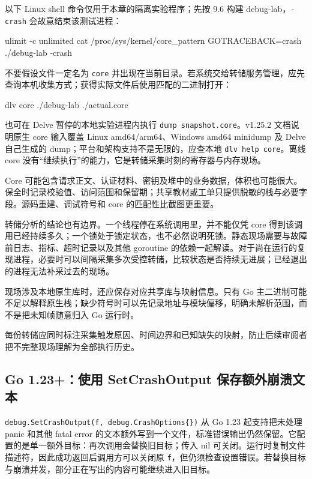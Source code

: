 \documentclass[UTF8,fontset=fandol,openany,11pt]{ctexbook}
\begin{document}
以下 Linux shell 命令仅用于本章的隔离实验程序；先按 9.6 构建 debug-lab，\texttt{-\allowbreak{}crash} 会故意结束该测试进程：

\begin{codeblock}
ulimit -c unlimited
cat /proc/sys/kernel/core_pattern
GOTRACEBACK=crash ./debug-lab -crash
\end{codeblock}

不要假设文件一定名为 \texttt{core} 并出现在当前目录。若系统交给转储服务管理，应先查询本机收集方式；获得实际文件后使用匹配的二进制打开：

\begin{codeblock}
dlv core ./debug-lab ./actual.core
\end{codeblock}

也可在 Delve 暂停的本地实验进程内执行 \texttt{dump snapshot.\allowbreak{}core}。v1.25.2 文档说明原生 core 输入覆盖 Linux amd64/arm64、Windows amd64 minidump 及 Delve 自己生成的 dump；平台和架构支持不是无限的，应查本地 \texttt{dlv help core}。离线 core 没有“继续执行”的能力，它是转储采集时刻的寄存器与内存现场。\cite{tools-delve-core}\cite{tools-delve-cli}

Core 可能包含请求正文、认证材料、密钥及堆中的业务数据，体积也可能很大。保全时记录校验值、访问范围和保留期；共享教材或工单只提供脱敏的栈与必要字段。源码重建、调试符号和 core 的匹配性比截图更重要。

转储分析的结论也有边界。一个线程停在系统调用里，并不能仅凭 core 得到该调用已经持续多久；一个锁处于锁定状态，也不必然说明死锁。静态现场需要与故障前日志、指标、超时记录以及其他 goroutine 的依赖一起解读。对于尚在运行的复现进程，必要时可以间隔采集多次受控转储，比较状态是否持续无进展；已经退出的进程无法补采过去的现场。

现场涉及本地原生库时，还应保存对应共享库与映射信息。只有 Go 主二进制可能不足以解释原生栈；缺少符号时可以先记录地址与模块偏移，明确未解析范围，而不是把未知帧随意归入 Go 运行时。

每份转储应同时标注采集触发原因、时间边界和已知缺失的映射，防止后续审阅者把不完整现场理解为全部执行历史。

\subsection{Go 1.23+：使用 SetCrashOutput 保存额外崩溃文本}
\texttt{debug.\allowbreak{}SetCrashOu\allowbreak{}tput(f, debug.\allowbreak{}CrashOptions\{\})} 从 Go 1.23 起支持把未处理 panic 和其他 fatal error 的文本额外写到一个文件，标准错误输出仍然保留。它配置的是单一额外目标：再次调用会替换旧目标；传入 nil 可关闭。运行时复制文件描述符，因此成功返回后调用方可以关闭原 \texttt{f}，但仍须检查设置错误。若替换目标与崩溃并发，部分正在写出的内容可能继续进入旧目标。\cite{tools-crash-output}
\end{document}
